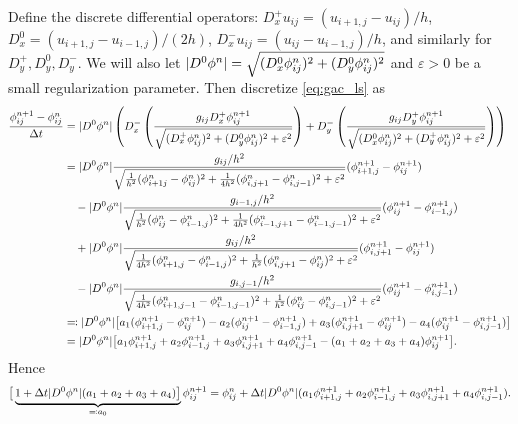 Define the discrete differential operators: $D_x^+ u_{ij} = (u_{i+1,j} - u_{ij})/h$, $D^0_x = (u_{i+1,j} - u_{i-1,j})/(2h)$,
$D^-_x u_{ij} = (u_{ij} - u_{i-1,j})/h$, and similarly for $D^+_y, D^0_y, D^-_y$.  We will also let $\lvert D^0 \phi^n\rvert = \sqrt{(D^0_x \phi^n_{ij})^2 + (D^0_y \phi^n_{ij})^2 } $ and $\varepsilon > 0$ be a small regularization parameter. 
Then discretize \eqref{eq:gac_ls} as 
\begin{align*}
\frac{\phi^{n+1}_{ij} - \phi^n_{ij}}{\Delta t} 
&= \lvert D^0 \phi^n\rvert
\left(
D^-_x \left( \frac{g_{ij}D^+_x \phi_{ij}^{n+1}}{\sqrt{ (D^+_x \phi^n_{ij})^2 + (D^0_y \phi^n_{ij})^2 + \varepsilon^2}}
\right) 
+ D^-_y \left(  \frac{g_{ij}D^+_y \phi_{ij}^{n+1}}{\sqrt{ (D^0_x \phi^n_{ij})^2 + (D^+_y \phi^n_{ij})^2  + \varepsilon^2}}
\right)
\right)
\\
&= 
\lvert D^0 \phi^n\rvert\frac{ g_{ij}/h^2 }{\sqrt{ \frac{1}{h^2}(\phi^n_{i+1j} -\phi^n_{ij} )^2 + \frac{1}{4h^2} (\phi^n_{i,j+1} - \phi^n_{i,j-1})^2 + \varepsilon^2}}
(\phi^{n+1}_{i+1,j} - \phi^{n+1}_{ij})
\\
&\quad-\lvert D^0 \phi^n\rvert\frac{ g_{i-1,j}/h^2 }{\sqrt{ \frac{1}{h^2}(\phi^n_{ij} -\phi^n_{i-1,j} )^2 + \frac{1}{4h^2} (\phi^n_{i-1,j+1} - \phi^n_{i-1,j-1})^2 + \varepsilon^2}}
(\phi^{n+1}_{ij} - \phi^{n+1}_{i-1,j}) 
\\
&\quad+\lvert D^0 \phi^n\rvert\frac{ g_{ij}/h^2 }{\sqrt{ \frac{1}{4h^2}(\phi^n_{i+1,j} -\phi^n_{i-1,j} )^2 + \frac{1}{h^2} (\phi^n_{i,j+1} - \phi^n_{ij})^2 + \varepsilon^2}}
(\phi^{n+1}_{i,j+1} - \phi^{n+1}_{ij}) 
\\
&\quad-\lvert D^0 \phi^n\rvert\frac{ g_{i,j-1}/h^2 }{\sqrt{ \frac{1}{4h^2}(\phi^n_{i+1,j-1} -\phi^n_{i-1,j-1} )^2 + \frac{1}{h^2} (\phi^n_{ij} - \phi^n_{i,j-1})^2 + \varepsilon^2}}
(\phi^{n+1}_{ij} - \phi^{n+1}_{i,j-1}) 
\\
&\eqqcolon \lvert D^0 \phi^n\rvert \big[ a_1(\phi^{n+1}_{i+1,j} - \phi^{n+1}_{ij})
- a_2(\phi^{n+1}_{ij} - \phi^{n+1}_{i-1,j}) 
+ a_3(\phi^{n+1}_{i,j+1} - \phi^{n+1}_{ij}) 
- a_4(\phi^{n+1}_{ij} - \phi^{n+1}_{i,j-1})
\big]
\\
&= \lvert D^0 \phi^n\rvert 
\big[ a_1\phi^{n+1}_{i+1,j} 
+ a_2\phi^{n+1}_{i-1,j} 
+ a_3\phi^{n+1}_{i,j+1} 
+ a_4\phi^{n+1}_{i,j-1}
- (a_1 + a_2 + a_3 + a_4) \phi^{n+1}_{ij}
\big].
\end{align*}
Hence 
\begin{align*}
\big[ 
\underbrace{1 + \Delta t\lvert D^0 \phi^n\rvert (a_1 + a_2 + a_3 + a_4) \big]
}_{\eqqcolon a_0} \phi^{n+1}_{ij} 
= \phi^n_{ij} + \Delta t\lvert D^0 \phi^n\rvert (a_1\phi^{n+1}_{i+1,j} 
+ a_2\phi^{n+1}_{i-1,j} 
+ a_3\phi^{n+1}_{i,j+1} 
+ a_4\phi^{n+1}_{i,j-1}).
\end{align*}
